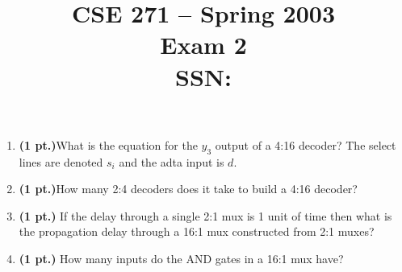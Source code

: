 \documentclass{article}
\begin{document}
\newcommand{\bs}{\backslash}


\title{
\Huge{CSE 271 -- Spring 2003}\\
\normalsize{Exam 2}\\
SSN:}
\date{}

\maketitle{}

\begin{enumerate}
\item {\bf (1 pt.)}What is the equation for the $y_3$ output of a 4:16 decoder?
The select lines are denoted $s_i$ and the adta input is $d$.

\item {\bf (1 pt.)}How many 2:4 decoders does it take to build a 4:16 decoder?


\item {\bf (1 pt.)} If the delay through a single 2:1 mux is 1 unit of time then
what is the propagation delay through a 16:1 mux constructed from 2:1 muxes?

\pagebreak
\item {\bf (1 pt.)} How many inputs do the AND gates in a 16:1 mux have?


\end{enumerate}
\end{document}
